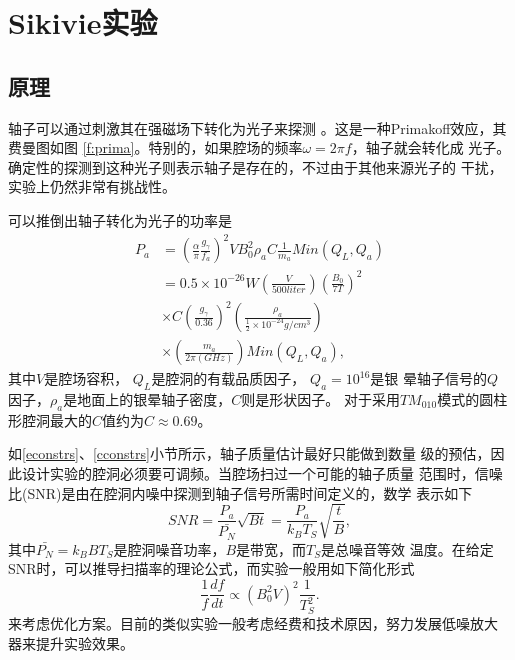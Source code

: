 \documentclass[twocolumn,12pt,a4paper]{article}
\begin{document}
\section{Sikivie实验}
\subsection{原理}
轴子可以通过刺激其在强磁场下转化为光子来探测
\cite{sikivie83a}\cite{sikivie85}。这是一种Primakoff效应，其费曼图如图
\ref{f:prima}。特别的，如果腔场的频率$\omega = 2\pi f$，轴子就会转化成
光子。确定性的探测到这种光子则表示轴子是存在的，不过由于其他来源光子的
干扰，实验上仍然非常有挑战性。\par
可以推倒出\cite{sikivie85}轴子转化为光子的功率是
\begin{equation}
  \label{m:pocov}
  \begin{split}
    P_a &= (\frac{\alpha}{\pi} \frac{g_\gamma}{f_a})^2 V B_0^2 \rho_a C \frac{1}{m_a} Min(Q_L,Q_a)\\
    &= 0.5\times10^{-26}W(\frac{V}{500 liter})(\frac{B_0}{7 T})^2 \\
    &\times  C (\frac{g_\gamma}{0.36})^2(\frac{\rho_a}{\frac{1}{2}\times10^{-24}g/cm^3})\\
    &\times (\frac{m_a}{2\pi(GHz)})Min(Q_L,Q_a),
\end{split}
\end{equation}
其中$V$是腔场容积， $Q_L$是腔洞的有载品质因子， $Q_a = 10^{16}$是银
晕轴子信号的$Q$因子，$\rho_a$是地面上的银晕轴子密度，$C$则是形状因子。
对于采用$TM_{010}$模式的圆柱形腔洞最大的$C$值约为$C \approx 0.69$。\par
如\ref{econstrs}、\ref{cconstrs}小节所示，轴子质量估计最好只能做到数量
级的预估，因此设计实验的腔洞必须要可调频。当腔场扫过一个可能的轴子质量
范围时，信噪比(SNR)是由在腔洞内噪中探测到轴子信号所需时间定义的，数学
表示如下
\begin{equation}
  \label{m:snr}
  SNR = \frac{P_a}{\bar{P_N}}\sqrt{Bt} = \frac{P_a}{k_BT_S}\sqrt{\frac{t}{B}},
\end{equation}
其中$\bar{P_N}= k_BBT_S$是腔洞噪音功率，$B$是带宽，而$T_S$是总噪音等效
温度。在给定SNR时，可以推导扫描率的理论公式，而实验一般用如下简化形式
\begin{equation}
  \label{m:f}
  \frac{1}{f}\frac{df}{dt} \propto (B_0^2V)^2\frac{1}{T_S^2}.
\end{equation}
来考虑优化方案\cite{asztalos01}。目前的类似实验一般考虑经费和技术原因，努力发展低噪放大
器来提升实验效果。
\end{document}
